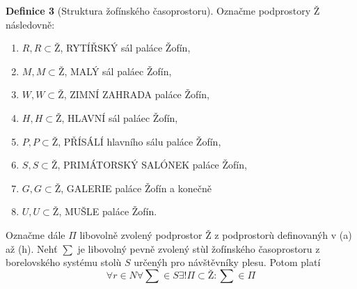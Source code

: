 \documentclass[12pt,a4paper]{article}
\begin{document}
\textbf{Definice 3}
(Struktura žofínského časoprostoru).
Označme podprostory $Ž$ následovně:
\begin{enumerate}
\item $R, R \subset Ž$, RYTÍŘSKÝ sál paláce Žofín,
\item $M, M \subset Ž$, MALÝ sál paláec Žofín,
\item $W, W \subset Ž$, ZIMNÍ ZAHRADA paláce Žofín,
\item $H, H \subset Ž$, HLAVNÍ sál paláec Žofín,
\item $P, P \subset Ž$, PŘÍSÁLÍ hlavního sálu paláce Žofín,
\item $S, S \subset Ž$, PRIMÁTORSKÝ SALÓNEK paláce Žofín,
\item $G, G \subset Ž$, GALERIE paláce Žofín a konečně
\item $U, U \subset Ž$, MUŠLE paláce Žofín.
\end{enumerate}
Označme dále $\Pi$ libovolně zvolený podprostor $Ž$
z podprostorù definovanýh v (a) až (h).
Nehť $\sum$ je libovolný pevně zvolený stùl žofínského časoprostoru z borelovského systému
stolù $S$ určenýh pro návštěvníky plesu. Potom platí
$$
\forall r \in N \forall \sum \in S \exists ! \Pi \subset Ž : \sum \in \Pi
$$

\end{document}
